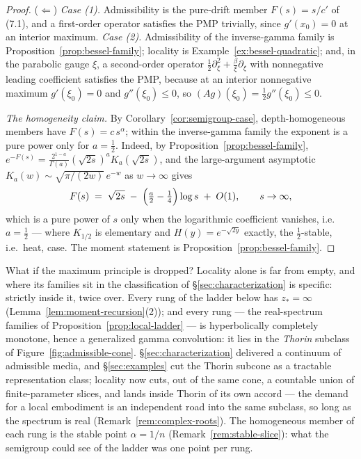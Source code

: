\begin{proof}
($\Leftarrow$) \emph{Case (1).} Admissibility is the pure-drift member $F(s) = s/c'$ of
(7.1), and a first-order operator satisfies the PMP trivially, since $g'(x_0) = 0$ at an
interior maximum. \emph{Case (2).} Admissibility of the inverse-gamma family is
Proposition~\ref{prop:bessel-family}; locality is Example~\ref{ex:bessel-quadratic}; and, in
the parabolic gauge $\xi$, a second-order operator $\tfrac12\partial_\xi^2 + \tfrac{\beta}{\xi}\partial_\xi$
with nonnegative leading coefficient satisfies the PMP, because at an interior nonnegative
maximum $g'(\xi_0) = 0$ and $g''(\xi_0) \le 0$, so $(Ag)(\xi_0) = \tfrac12 g''(\xi_0) \le 0$.

\emph{The homogeneity claim.} By Corollary~\ref{cor:semigroup-case}, depth-homogeneous
members have $F(s) = c\,s^{\alpha}$; within the inverse-gamma family the exponent is a pure
power only for $a = \tfrac12$. Indeed, by Proposition~\ref{prop:bessel-family}, $e^{-F(s)} =
\tfrac{2^{1-a}}{\Gamma(a)}(\sqrt{2s})^a K_a(\sqrt{2s})$, and the large-argument asymptotic
$K_a(w) \sim \sqrt{\pi/(2w)}\,e^{-w}$ as $w \to \infty$ gives
\[
  F(s) \;=\; \sqrt{2s} \;-\; \Bigl(\tfrac a2 - \tfrac14\Bigr)\log s \;+\; O(1),
  \qquad s \to \infty,
\]
which is a pure power of $s$ only when the logarithmic coefficient vanishes, i.e.\
$a = \tfrac12$ --- where $K_{1/2}$ is elementary and $H(y) = e^{-\sqrt{2y}}$ exactly, the
$\tfrac12$-stable, i.e.\ heat, case. The moment statement is
Proposition~\ref{prop:bessel-family}.
\end{proof}

What if the maximum principle is dropped? Locality alone is far from empty, and where its
families sit in the classification of \S\ref{sec:characterization} is specific: strictly
inside it, twice over. Every rung of the ladder below has $z_* = \infty$
(Lemma~\ref{lem:moment-recursion}(2)); and every rung --- the real-spectrum families of
Proposition~\ref{prop:local-ladder} --- is hyperbolically completely monotone, hence a
generalized gamma convolution: it lies in the \emph{Thorin} subclass of
Figure~\ref{fig:admissible-cone}. \S\ref{sec:characterization} delivered a continuum of
admissible media, and \S\ref{sec:examples} cut the Thorin subcone as a tractable
representation class; locality now cuts, out of the same cone, a countable union of
finite-parameter slices, and lands inside Thorin of its own accord --- the demand for a
local embodiment is an independent road into the same subclass, so long as the spectrum is
real (Remark~\ref{rem:complex-roots}). The homogeneous member of each rung is the stable
point $\alpha = 1/n$ (Remark~\ref{rem:stable-slice}): what the semigroup could see of the
ladder was one point per rung.

